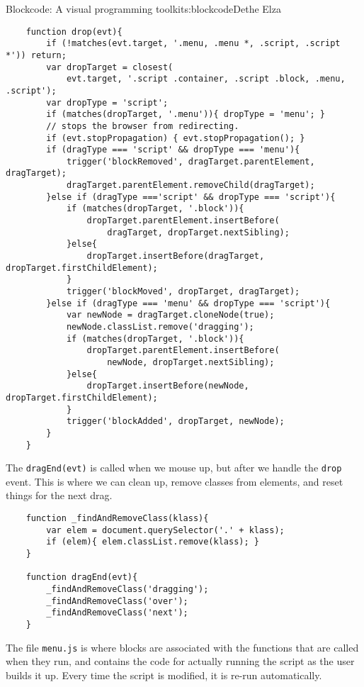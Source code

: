 \begin{aosachapter}{Blockcode: A visual programming toolkit}{s:blockcode}{Dethe Elza}
\begin{verbatim}
    function drop(evt){
        if (!matches(evt.target, '.menu, .menu *, .script, .script *')) return;
        var dropTarget = closest(
            evt.target, '.script .container, .script .block, .menu, .script');
        var dropType = 'script';
        if (matches(dropTarget, '.menu')){ dropType = 'menu'; }
        // stops the browser from redirecting.
        if (evt.stopPropagation) { evt.stopPropagation(); }
        if (dragType === 'script' && dropType === 'menu'){
            trigger('blockRemoved', dragTarget.parentElement, dragTarget);
            dragTarget.parentElement.removeChild(dragTarget);
        }else if (dragType ==='script' && dropType === 'script'){
            if (matches(dropTarget, '.block')){
                dropTarget.parentElement.insertBefore(
                    dragTarget, dropTarget.nextSibling);
            }else{
                dropTarget.insertBefore(dragTarget, dropTarget.firstChildElement);
            }
            trigger('blockMoved', dropTarget, dragTarget);
        }else if (dragType === 'menu' && dropType === 'script'){
            var newNode = dragTarget.cloneNode(true);
            newNode.classList.remove('dragging');
            if (matches(dropTarget, '.block')){
                dropTarget.parentElement.insertBefore(
                    newNode, dropTarget.nextSibling);
            }else{
                dropTarget.insertBefore(newNode, dropTarget.firstChildElement);
            }
            trigger('blockAdded', dropTarget, newNode);
        }
    }
\end{verbatim}

The \texttt{dragEnd(evt)} is called when we mouse up, but after we
handle the \texttt{drop} event. This is where we can clean up, remove
classes from elements, and reset things for the next drag.

\begin{verbatim}
    function _findAndRemoveClass(klass){
        var elem = document.querySelector('.' + klass);
        if (elem){ elem.classList.remove(klass); }
    }

    function dragEnd(evt){
        _findAndRemoveClass('dragging');
        _findAndRemoveClass('over');
        _findAndRemoveClass('next');
    }
\end{verbatim}

\label{menu.js}

The file \texttt{menu.js} is where blocks are associated with the
functions that are called when they run, and contains the code for
actually running the script as the user builds it up. Every time the
script is modified, it is re-run automatically.


\end{aosachapter}
